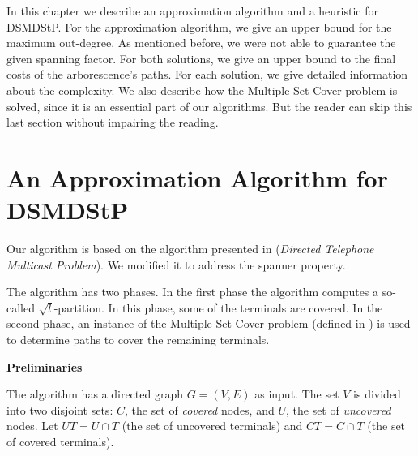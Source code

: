 \label{sec:algorithms}
\acresetall

In this chapter we describe an approximation algorithm and a heuristic for DSMDStP. 
For the approximation algorithm, we give an upper bound for the maximum out-degree. As mentioned before, 
we were not able to guarantee the given spanning factor. For both solutions, we give an upper bound to the final costs of the arborescence's paths. 
For each solution, we give detailed information about the complexity. We also describe how the Multiple Set-Cover problem is solved, 
since it is an essential part of our algorithms. But the reader can skip this last section without impairing the reading.

\section{An Approximation Algorithm for DSMDStP}
\label{sec:algorithm}

Our algorithm is based on the algorithm presented in \cite{Elkin2006} (\emph{Directed Telephone Multicast Problem}). 
We modified it to address the spanner property. 

The algorithm has two phases. In the first phase the algorithm computes a so-called $\sqrt{l}$-partition. In this phase, some of the terminals are covered.
In the second phase, an instance of the Multiple Set-Cover problem (defined in \cite{Elkin2006}) is used to determine paths to cover the remaining terminals.


\vspace{0.1cm}
\noindent \textbf{Preliminaries}
\vspace{0.1cm}

The algorithm has a directed graph $G=(V, E)$ as input. The set $V$ is divided into two disjoint sets: $C$, the set of \emph{covered} nodes, and $U$, the set of \emph{uncovered} nodes. 
Let $UT = U \cap T$ (the set of uncovered terminals) and 
$CT = C \cap T$ (the set of covered terminals). 

